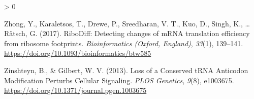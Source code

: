 \documentclass[
  12pt,
  openany]{book}
\newlength{\cslhangindent}
\newenvironment{CSLReferences}[2] %
 {%
  \setlength{\parindent}{0pt}
  \ifodd #1 \everypar{\setlength{\hangindent}{\cslhangindent}}\ignorespaces\fi
  \ifnum #2 > 0
  \setlength{\parskip}{#2\baselineskip}
  \fi
 }%
 {}
\begin{document}
\begin{CSLReferences}{1}{0}
\leavevmode\hypertarget{ref-Zhong2017}{}%
Zhong, Y., Karaletsos, T., Drewe, P., Sreedharan, V. T., Kuo, D., Singh, K., \ldots{} Rätsch, G. (2017). {RiboDiff}: Detecting changes of {mRNA} translation efficiency from ribosome footprints. \emph{Bioinformatics (Oxford, England)}, \emph{33}(1), 139--141. \url{https://doi.org/10.1093/bioinformatics/btw585}

\leavevmode\hypertarget{ref-Zinshteyn2013}{}%
Zinshteyn, B., \& Gilbert, W. V. (2013). Loss of a {Conserved tRNA Anticodon Modification Perturbs Cellular Signaling}. \emph{PLOS Genetics}, \emph{9}(8), e1003675. \url{https://doi.org/10.1371/journal.pgen.1003675}

\end{CSLReferences}
\end{document}

